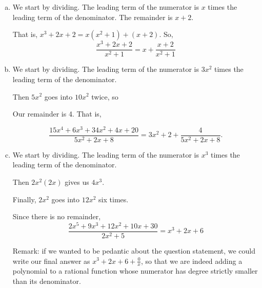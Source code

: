 \begin{solution}
\begin{enumerate}[(a)]
\item We start by dividing. The leading term of the numerator is $x$ times the leading term of the denominator. The remainder is $x+2$.
\begin{center}
\end{center}
That is, $x^3+2x+2 = x(x^2+1)+(x+2)$. So,
 \[\frac{x^3+2x+2}{x^2+1} = x+\frac{x+2}{x^2+1}\]

\item We start by dividing. The leading term of the numerator is $3x^2$ times the leading term of the denominator.
\begin{center}
\end{center}
Then $5x^2$ goes into $10x^2$ twice, so
\begin{center}
\end{center}
Our remainder is 4. That is,

\[\dfrac{15x^4+6x^3+34x^2+4x+20}{5x^2+2x+8} = 3x^2+2+\frac{4}{5x^2+2x+8}.\]

\item
We start by dividing. The leading term of the numerator is $x^3$ times the leading term of the denominator.

\begin{center}
\end{center}

Then $2x^2(2x)$ gives us $4x^3$.
\begin{center}
\end{center}

Finally, $2x^2$ goes into $12x^2$ six times.
\begin{center}
\end{center}

Since there is no remainder,
\[\dfrac{2x^5+9x^3+12x^2+10x+30}{2x^2+5}=x^3+2x+6\]

Remark: if we wanted to be pedantic about the question statement, we could write our final answer as $x^3+2x+6+\frac{0}{x}$, so that we are indeed adding a polynomial to a rational function whose numerator has degree strictly smaller than its denominator.
\end{enumerate}

\end{solution}



